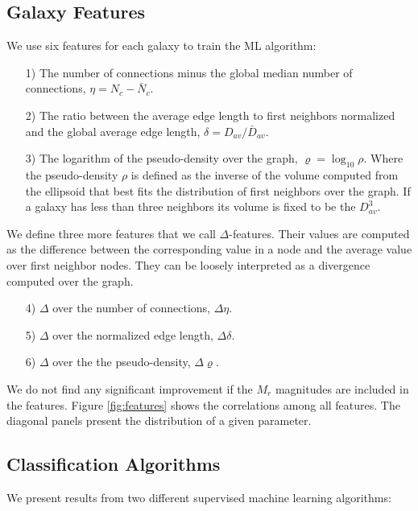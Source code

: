 \documentclass[usenatbib]{mnras}
\begin{document}
\subsection{Galaxy Features}

We use six features for each galaxy to train the ML algorithm:
\begin{enumerate}
\item[1)]
The number of connections minus the global median number of
connections, $\eta = N_c - \bar{N}_c$. 
\item[2)]
The ratio between the average edge length to first neighbors 
normalized and the global average edge length, $\delta=D_{av}/\bar{D}_{av}$. 
\item[3)] 
The logarithm of the pseudo-density over the graph,
  $\varrho=\log_{10}\rho$.   
Where the pseudo-density $\rho$ is defined as the inverse of the volume
computed from the ellipsoid that best fits the distribution of first
neighbors over the graph. 
If a galaxy has less than three neighbors its volume is fixed to be the $D_{av}^3$.
\end{enumerate}
\noindent
We define three more features that we call $\Delta$-features.
Their values are computed as the difference between the corresponding
value in a node and the average value over first neighbor nodes.  
They can be loosely interpreted as a divergence computed over the graph.

\begin{enumerate}
\item[4)] $\Delta$ over the number of connections, $\Delta\eta$.
\item[5)] $\Delta$ over the normalized edge length, $\Delta\delta$.
\item[6)] $\Delta$ over the the pseudo-density, $\Delta\varrho$.
\end{enumerate}

We do not find any significant improvement if the $M_r$ magnitudes are included in the features. 
Figure \ref{fig:features} shows the correlations among all features.
The diagonal panels present the distribution of a given parameter.



\subsection{Classification Algorithms}

We present results from two different supervised machine learning algorithms:
\end{document}
